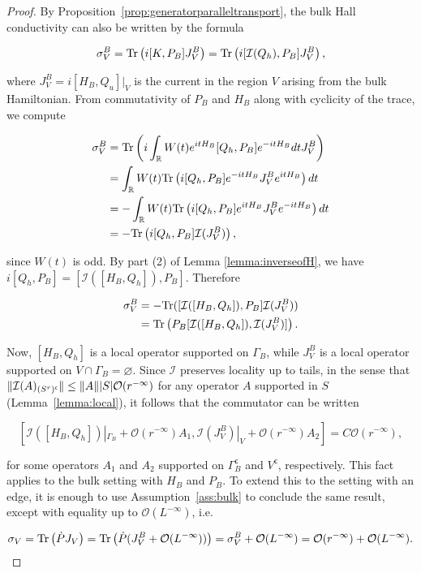 \documentclass[12pt, letterpaper]{article}
\begin{document}
\begin{proof}
By Proposition~\ref{prop:generatorparalleltransport}, the bulk Hall conductivity can also be written by the formula 

\[\sigma_V^B = \text{Tr}\left(i[K,P_B]J_V^B\right) = \text{Tr}\left(i[\mathcal{I}(Q_h), P_B]J_V^B\right),\]

where $J_V^B = i[H_B, Q_u]|_V$ is the current in the region $V$ arising from the bulk Hamiltonian. From commutativity of $P_B$ and $H_B$ along with cyclicity of the trace, we compute

\[\begin{aligned}
\sigma_V^B &= \text{Tr}\left(i\int_{\mathbb{R}} W(t) e^{itH_B} [Q_h,P_B] e^{-itH_B}dt J_V^B \right)\\
&= \int_{\mathbb{R}} W(t) \text{Tr}\left(i[Q_h,P_B] e^{-itH_B}J_V^Be^{itH_B}\right)dt\\
&= -\int_{\mathbb{R}} W(t) \text{Tr}\left(i[Q_h,P_B] e^{itH_B}J_V^Be^{-itH_B}\right)dt\\
&=- \text{Tr}\left(i[Q_h,P_B]\mathcal{I}(J_V^B)\right),
\end{aligned}\]

since $W(t)$ is odd. By part (2) of Lemma \ref{lemma:inverseofH}, we have $i[Q_h,P_B] = [\mathcal{I}([H_B,Q_h]),P_B]$. Therefore

\[\begin{aligned}
\sigma_V^B &=-\text{Tr}([\mathcal{I}([H_B,Q_h]), P_B]\mathcal{I}(J_V^B))\\
&= \text{Tr}\left( P_B[\mathcal{I}([H_B,Q_h]), \mathcal{I}(J_V^B)]\right).
\end{aligned}\]

Now, $[H_B, Q_h]$ is a local operator supported on $\Gamma_B$, while $J_V^B$ is a local operator supported on $V \cap \Gamma_B = \varnothing$. Since $\mathcal{I}$ preserves locality up to tails, in the sense that $\lVert \mathcal{I}(A)_{(S^r)^\mathsf{c}} \rVert \leq \lVert A \rVert |S| \mathcal{O}(r^{-\infty})$ for any operator $A$ supported in $S$ (Lemma~\ref{lemma:local}), it follows that the commutator can be written

\[[\mathcal{I}([H_B,Q_h])|_{\Gamma_B} + \mathcal{O}(r^{-\infty}) A_1, \mathcal{I}(J_V^B)|_V + \mathcal{O}(r^{-\infty}) A_2] = C\mathcal{O}(r^{-\infty}),\]

for some operators $A_1$ and $A_2$ supported on $\Gamma_B^\mathsf{c}$ and $V^\mathsf{c}$, respectively. This fact applies to the bulk setting with $H_B$ and $P_B$. To extend this to the setting with an edge, it is enough to use Assumption~\ref{ass:bulk} to conclude the same result, except with equality up to $\mathcal{O}(L^{-\infty})$, i.e.

\[\sigma_V = \text{Tr}\left(\dot{P}J_V\right) = \text{Tr}\left(\dot{P}(J_V^B + \mathcal{O}(L^{-\infty}))\right) = \sigma_V^B + \mathcal{O}(L^{-\infty}) = \mathcal{O}(r^{-\infty}) + \mathcal{O}(L^{-\infty}).\]

\end{proof}
\end{document}
